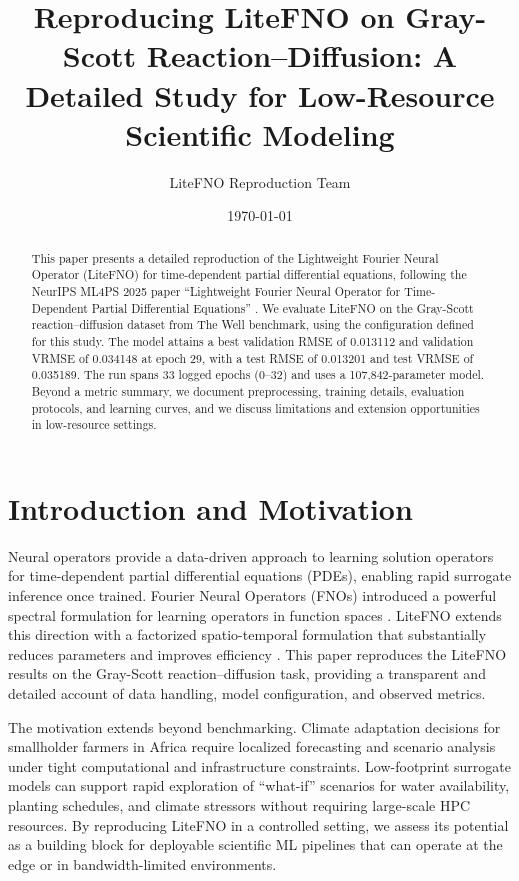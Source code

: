 \documentclass[11pt]{article}
\title{Reproducing LiteFNO on Gray-Scott Reaction--Diffusion: A Detailed Study for Low-Resource Scientific Modeling}
\author{LiteFNO Reproduction Team}
\date{\today}
\begin{document}
\maketitle

\begin{abstract}
This paper presents a detailed reproduction of the Lightweight Fourier Neural
Operator (LiteFNO) for time-dependent partial differential equations, following
the NeurIPS ML4PS 2025 paper ``Lightweight Fourier Neural Operator for
Time-Dependent Partial Differential Equations'' \cite{litefno2025}. We evaluate
LiteFNO on the Gray-Scott reaction--diffusion dataset from The Well benchmark,
using the configuration defined for this study. The model attains a best
validation RMSE of \num{0.013112} and validation VRMSE of \num{0.034148} at epoch
29, with a test RMSE of \num{0.013201} and test VRMSE of \num{0.035189}. The run
spans 33 logged epochs (0--32) and uses a 107,842-parameter model. Beyond a
metric summary, we document preprocessing, training details, evaluation
protocols, and learning curves, and we discuss limitations and extension
opportunities in low-resource settings.
\end{abstract}

\section{Introduction and Motivation}
Neural operators provide a data-driven approach to learning solution operators
for time-dependent partial differential equations (PDEs), enabling rapid
surrogate inference once trained. Fourier Neural Operators (FNOs) introduced a
powerful spectral formulation for learning operators in function spaces
\cite{li2020fourier}. LiteFNO extends this direction with a factorized
spatio-temporal formulation that substantially reduces parameters and improves
efficiency \cite{litefno2025}. This paper reproduces the LiteFNO results on the
Gray-Scott reaction--diffusion task, providing a transparent and detailed
account of data handling, model configuration, and observed metrics.

The motivation extends beyond benchmarking. Climate adaptation decisions for
smallholder farmers in Africa require localized forecasting and scenario
analysis under tight computational and infrastructure constraints. Low-footprint
surrogate models can support rapid exploration of ``what-if'' scenarios for
water availability, planting schedules, and climate stressors without requiring
large-scale HPC resources. By reproducing LiteFNO in a controlled setting, we
assess its potential as a building block for deployable scientific ML pipelines
that can operate at the edge or in bandwidth-limited environments.
\end{document}
